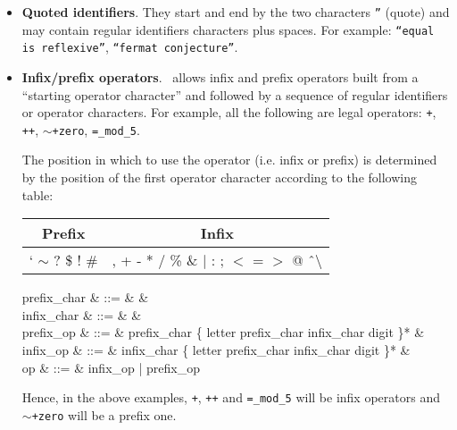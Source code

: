 \begin{itemize}
  \item {\bf Quoted identifiers}.
    They start and end by the two characters {\tt ''} (quote) and may
    contain regular identifiers characters plus spaces. For example:
    {\tt ``equal is reflexive''}, {\tt ``fermat conjecture''}.
  \item {\bf Infix/prefix operators}.
    \focal\ allows infix and prefix operators built from a
    ``starting operator character'' and followed by a sequence of
    regular identifiers or operator characters. For example, all the
    following are legal operators: 
    {\tt +}, {\tt ++}, {\tt $\sim$+zero}, {\tt =\_mod\_5}.

    The position in which to use the operator (i.e. infix or prefix)
    is determined by the position of the first operator character
    according to the following table:
    \begin{center}
    \begin{tabular}{|c|c|}
    \hline
    Prefix & Infix \\
    \hline
    ` $\sim$ ? \$ ! \#                            &
    , + - * / \% \& $|$ : ; $<$ = $>$ @ \^\ $\setminus$ \\
    \hline
    \end{tabular}
    \end{center}

    \begin{syntax}
    prefix\_char & ::= & & \\
    infix\_char & ::= &
         & \\
    prefix\_op & ::= & prefix\_char
        \{ letter \mid prefix\_char \mid infix\_char
        \mid digit \mid \terminal{\_} \}* & \\
    infix\_op & ::= & infix\_char
        \{ letter \mid prefix\_char \mid infix\_char
        \mid digit \mid \terminal{\_} \}* & \\
    op & ::= & infix\_op | prefix\_op
    \end{syntax}

    Hence, in the above examples, {\tt +}, {\tt ++} and
    {\tt =\_mod\_5} will be infix operators and {\tt $\sim$+zero} will
    be a prefix one.


\end{itemize}
